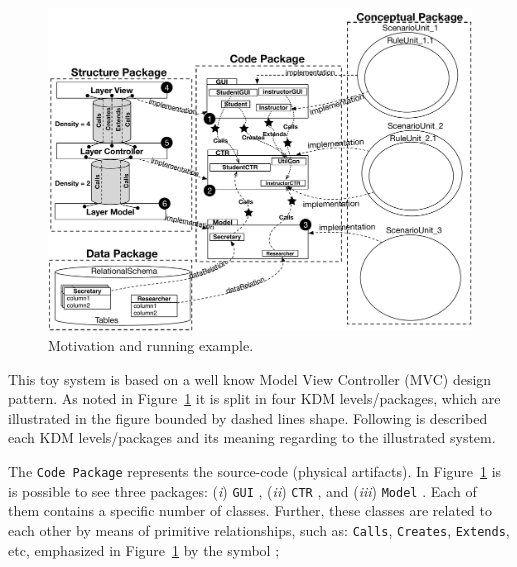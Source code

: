 \begin{figure}
	\centering
	\includegraphics[scale=0.58]{figuras/NewSystemVersion}
	\caption{Motivation and running example.}
	\label{fig:system}
\end{figure}
 
This toy system is based on a well know Model View Controller (MVC) design pattern. As noted in Figure~\ref{fig:system} it is split in four KDM levels/packages, which are illustrated in the figure bounded by dashed lines shape. Following is described each KDM levels/packages and its meaning regarding to the illustrated system.

The \texttt{Code Package} represents the source-code (physical artifacts). In Figure~\ref{fig:system} is is possible to see three packages: (\textit{i}) \texttt{GUI} , (\textit{ii}) \texttt{CTR} , and (\textit{iii}) \texttt{Model} . Each of them contains a specific number of classes. %
Further, these classes are related to each other by means of primitive relationships, such as: \texttt{Calls}, \texttt{Creates}, \texttt{Extends}, etc, emphasized in Figure~\ref{fig:system} by the symbol ;

